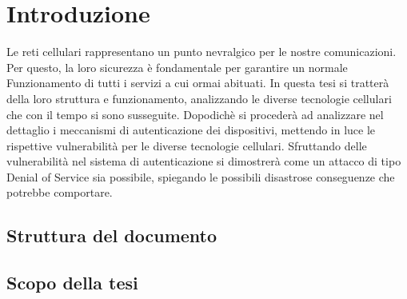 \section{Introduzione}
Le reti cellulari rappresentano un punto nevralgico per le nostre comunicazioni.
Per questo, la loro sicurezza è fondamentale per garantire un normale Funzionamento
di tutti i servizi a cui ormai abituati.
In questa tesi si tratterà della loro struttura e funzionamento, analizzando le diverse
tecnologie cellulari che con il tempo si sono susseguite. Dopodichè si procederà ad analizzare
nel dettaglio i meccanismi di autenticazione dei dispositivi, mettendo in luce le rispettive vulnerabilità
per le diverse tecnologie cellulari. Sfruttando delle vulnerabilità nel sistema di autenticazione si dimostrerà
come un attacco di tipo Denial of Service sia possibile, spiegando le possibili disastrose conseguenze che 
potrebbe comportare.
\subsection{Struttura del documento}
\subsection{Scopo della tesi}